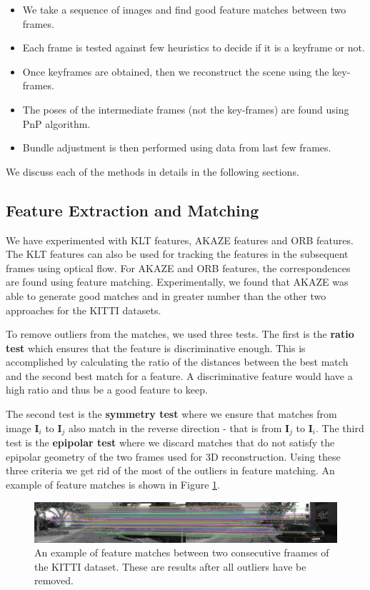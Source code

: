 \documentclass{article}
\begin{document}
\begin{itemize}
\item We take a sequence of images and find good feature matches between two frames.
\item Each frame is tested against few heuristics to decide if it is a keyframe or not.
\item Once keyframes are obtained, then we reconstruct the scene using the key-frames.
\item The poses of the intermediate frames (not the key-frames) are found using PnP algorithm.
\item Bundle adjustment is then performed using data from last few frames.
\end{itemize}

We discuss each of the methods in details in the following sections.

\subsection{Feature Extraction and Matching}
We have experimented with KLT features, AKAZE features and ORB features. The KLT features can also be used for tracking the features in the subsequent frames using optical flow. For AKAZE\cite{akaze} and ORB features, the correspondences are found using feature matching. Experimentally, we found that AKAZE was able to generate good matches and in greater number than the other two approaches for the KITTI datasets\cite{kitti}.

To remove outliers from the matches, we used three tests. The first is the \textbf{ratio test} which ensures that the feature is discriminative enough. This is accomplished by calculating the ratio of the distances between the best match and the second best match for a feature. A discriminative feature would have a high ratio and thus be a good feature to keep.

The second test is the \textbf{symmetry test} where we ensure that matches from image $\textbf{I}_i$ to $\textbf{I}_j$ also match in the reverse direction - that is from $\textbf{I}_j$ to $\textbf{I}_i$. The third test is the \textbf{epipolar test} where we discard matches that do not satisfy the epipolar geometry of the two frames used for 3D reconstruction. Using these three criteria we get rid of the most of the outliers in feature matching. An example of feature matches is shown in Figure \ref{fig:matches}.

\begin{figure}
    \centering
    \includegraphics[width=\linewidth]{./matches.png}
    \caption{An example of feature matches between two consecutive fraames of the KITTI dataset. These are results after all outliers have be removed.}
    \label{fig:matches}
\end{figure}
\end{document}

